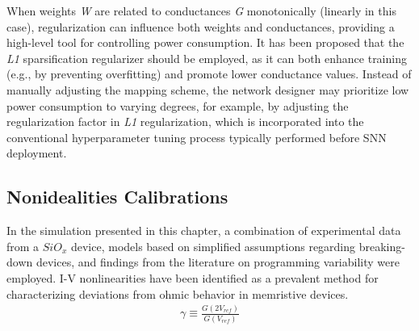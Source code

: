 \noindent When weights \textit{W} are related to conductances \textit{G} monotonically (linearly in this case), regularization can influence both weights and conductances, providing a high-level tool for controlling power consumption. It has been proposed that the \textit{L1} sparsification regularizer \cite{han2015learning} should be employed, as it can both enhance training (e.g., by preventing overfitting) and promote lower conductance values. Instead of manually adjusting the mapping scheme, the network designer may prioritize low power consumption to varying degrees, for example, by adjusting the regularization factor in \textit{L1} regularization, which is incorporated into the conventional hyperparameter tuning process \cite{feurer2019hyperparameter} typically performed before SNN deployment.

\subsection[Nonidealities Calibrations]{Nonidealities Calibrations}

\noindent In the simulation presented in this chapter, a combination of experimental data from a $SiO_x$ device, models based on simplified assumptions regarding breaking-down devices, and findings from the literature on programming variability were employed. I-V nonlinearities have been identified as a prevalent method for characterizing deviations from ohmic behavior in memristive devices.
\begin{align}
\gamma \equiv \frac{G\left( 2V_{ref} \right)}{G\left( V_{ref} \right)}  \label{eq:6.35}
\end{align}


